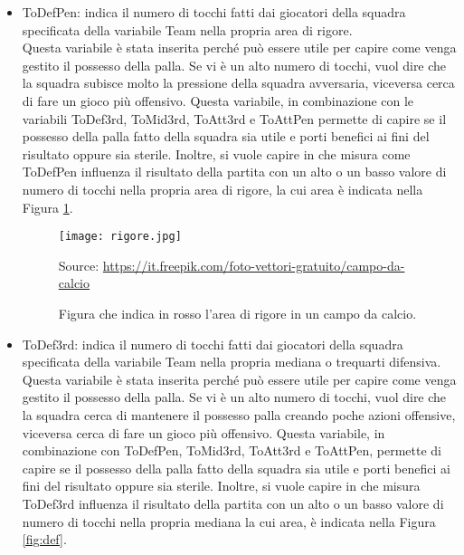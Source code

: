 \begin{itemize}
	\item \textsf{ToDefPen}: indica il numero di tocchi fatti dai giocatori della squadra specificata della variabile \textsf{Team} nella propria area di rigore. \\
	Questa variabile è stata inserita perché può essere utile per capire come venga gestito il possesso della palla. Se vi è un alto numero di tocchi, vuol dire che la squadra subisce molto la pressione della squadra avversaria, viceversa cerca di fare un gioco più offensivo. Questa variabile, in combinazione con le variabili \textsf{ToDef3rd}, \textsf{ToMid3rd}, \textsf{ToAtt3rd} e \textsf{ToAttPen} permette di capire se il possesso della palla fatto della squadra sia utile e porti benefici ai fini del risultato oppure sia sterile. Inoltre, si vuole capire in che misura come \textsf{ToDefPen} influenza il risultato della partita con un alto o un basso valore di numero di tocchi nella propria area di rigore, la cui area è indicata nella Figura \ref{fig:penalty}.
	
	\begin{figure}[!ht]
		\begin{center}
			\texttt{[image: rigore.jpg]}
			\caption{Figura che indica in rosso l'area di rigore in un campo da calcio.}
			Source: \url{https://it.freepik.com/foto-vettori-gratuito/campo-da-calcio} 
			\label{fig:penalty}
		\end{center}
	\end{figure}
	
	
	\item \textsf{ToDef3rd}: indica il numero di tocchi fatti dai giocatori della squadra specificata della variabile \textsf{Team} nella propria mediana o trequarti difensiva. \\
	Questa variabile è stata inserita perché può essere utile per capire come venga gestito il possesso della palla. Se vi è un alto numero di tocchi, vuol dire che la squadra cerca di mantenere il possesso palla creando poche azioni offensive, viceversa cerca di fare un gioco più offensivo. Questa variabile, in combinazione con \textsf{ToDefPen}, \textsf{ToMid3rd}, \textsf{ToAtt3rd} e \textsf{ToAttPen}, permette di capire se il possesso della palla fatto della squadra sia utile e porti benefici ai fini del risultato oppure sia sterile. Inoltre, si vuole capire in che misura \textsf{ToDef3rd} influenza il risultato della partita con un alto o un basso valore di numero di tocchi nella propria mediana la cui area, è indicata nella Figura \ref{fig:def}.
	

\end{itemize}
